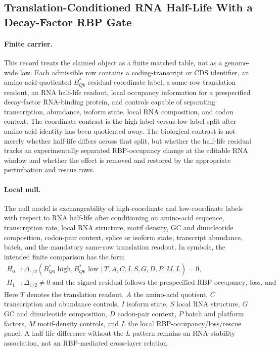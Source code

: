 \subsection{Translation-Conditioned RNA Half-Life With a Decay-Factor RBP Gate}\label{subsec:q6-translation-conditioned-rna-half-life-rbp-bridge-cross-layer}

\paragraph{Finite carrier.}
This record treats the claimed object as a finite matched table, not as a genome-wide law.  Each admissible row contains a coding-transcript or CDS identifier, an amino-acid-quotiented $B^*_{Q6}$ residual-coordinate label, a same-row translation readout, an RNA half-life readout, local occupancy information for a prespecified decay-factor RNA-binding protein, and controls capable of separating transcription, abundance, isoform state, local RNA composition, and codon context.  The coordinate contrast is the high-label versus low-label split after amino-acid identity has been quotiented away.  The biological contrast is not merely whether half-life differs across that split, but whether the half-life residual tracks an experimentally separated RBP-occupancy change at the editable RNA window and whether the effect is removed and restored by the appropriate perturbation and rescue rows.

\paragraph{Local null.}
The null model is exchangeability of high-coordinate and low-coordinate labels with respect to RNA half-life after conditioning on amino-acid sequence, transcription rate, local RNA structure, motif density, GC and dinucleotide composition, codon-pair context, splice or isoform state, transcript abundance, batch, and the mandatory same-row translation readout.  In symbols, the intended finite comparison has the form
$$
\begin{aligned}
H_0 &: \Delta_{1/2}(B^*_{Q6}\text{ high},B^*_{Q6}\text{ low}\mid T,A,C,I,S,G,D,P,M,L)=0,\\
H_1 &: \Delta_{1/2}\neq 0\text{ and the signed residual follows the prespecified RBP occupancy, loss, and rescue pattern.}
\end{aligned}
$$
Here $T$ denotes the translation readout, $A$ the amino-acid quotient, $C$ transcription and abundance controls, $I$ isoform state, $S$ local RNA structure, $G$ GC and dinucleotide composition, $D$ codon-pair context, $P$ batch and platform factors, $M$ motif-density controls, and $L$ the local RBP-occupancy/loss/rescue panel.  A half-life difference without the $L$ pattern remains an RNA-stability association, not an RBP-mediated cross-layer relation.


